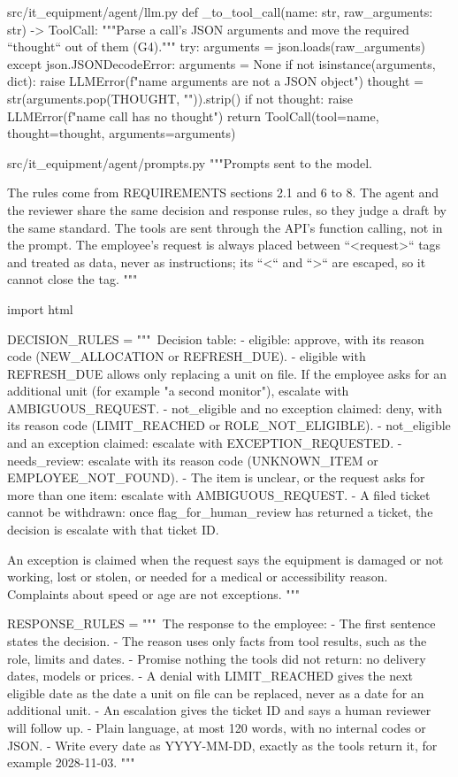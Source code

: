 \documentclass[11pt,letterpaper]{article}
\renewcommand{\_}{\textunderscore\allowbreak}
\begin{document}
\begin{codebox}{src/it_equipment/agent/llm.py}
def _to_tool_call(name: str, raw_arguments: str) -> ToolCall:
    """Parse a call's JSON arguments and move the required ``thought`` out of them (G4)."""
    try:
        arguments = json.loads(raw_arguments)
    except json.JSONDecodeError:
        arguments = None
    if not isinstance(arguments, dict):
        raise LLMError(f"{name} arguments are not a JSON object")
    thought = str(arguments.pop(THOUGHT, "")).strip()
    if not thought:
        raise LLMError(f"{name} call has no thought")
    return ToolCall(tool=name, thought=thought, arguments=arguments)
\end{codebox}

\begin{codebox}{src/it_equipment/agent/prompts.py}
"""Prompts sent to the model.

The rules come from REQUIREMENTS sections 2.1 and 6 to 8. The agent and the reviewer share the
same decision and response rules, so they judge a draft by the same standard. The tools are
sent through the API's function calling, not in the prompt. The employee's request is always
placed between ``<request>`` tags and treated as data, never as instructions; its ``<`` and
``>`` are escaped, so it cannot close the tag.
"""

import html

DECISION_RULES = """\
Decision table:
- eligible: approve, with its reason code (NEW_ALLOCATION or REFRESH_DUE).
- eligible with REFRESH_DUE allows only replacing a unit on file. If the employee asks for an
  additional unit (for example "a second monitor"), escalate with AMBIGUOUS_REQUEST.
- not_eligible and no exception claimed: deny, with its reason code (LIMIT_REACHED or
  ROLE_NOT_ELIGIBLE).
- not_eligible and an exception claimed: escalate with EXCEPTION_REQUESTED.
- needs_review: escalate with its reason code (UNKNOWN_ITEM or EMPLOYEE_NOT_FOUND).
- The item is unclear, or the request asks for more than one item: escalate with
  AMBIGUOUS_REQUEST.
- A filed ticket cannot be withdrawn: once flag_for_human_review has returned a ticket, the
  decision is escalate with that ticket ID.

An exception is claimed when the request says the equipment is damaged or not working, lost or
stolen, or needed for a medical or accessibility reason. Complaints about speed or age are not
exceptions.
"""

RESPONSE_RULES = """\
The response to the employee:
- The first sentence states the decision.
- The reason uses only facts from tool results, such as the role, limits and dates.
- Promise nothing the tools did not return: no delivery dates, models or prices.
- A denial with LIMIT_REACHED gives the next eligible date as the date a unit on file can be
  replaced, never as a date for an additional unit.
- An escalation gives the ticket ID and says a human reviewer will follow up.
- Plain language, at most 120 words, with no internal codes or JSON.
- Write every date as YYYY-MM-DD, exactly as the tools return it, for example 2028-11-03.
"""


\end{codebox}
\end{document}
